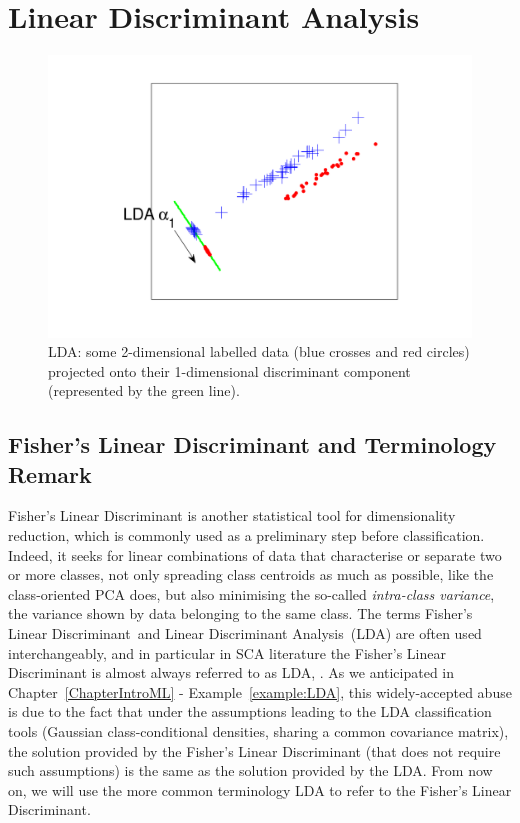 
\section{Linear Discriminant Analysis}\label{sec:LDA}

\begin{figure}
\centering
\includegraphics[width=.5\textwidth]{../Figures/PCA_LDA_geometric/LDAprojection.pdf} 
\caption{LDA: some 2-dimensional labelled data (blue crosses and red circles) projected onto their 1-dimensional discriminant component (represented by the green line).}\label{fig:LDAprojection}
\end{figure}

\subsection{Fisher's Linear Discriminant and Terminology Remark}
Fisher's Linear Discriminant \cite{Fukunaga} is another statistical tool for dimensionality reduction, which is commonly used as a preliminary step before classification. Indeed, it seeks for linear combinations of data that characterise or separate two or more classes, not only spreading class centroids as much as possible, like the class-oriented PCA does, but also minimising the so-called {\em intra-class variance}, \ie the variance shown by data belonging to the same class. The terms \textquotedbl Fisher's Linear Discriminant\textquotedbl \  and \textquotedbl Linear Discriminant Analysis\textquotedbl \ (LDA) are often used interchangeably, and in particular in SCA literature the Fisher's Linear Discriminant is almost always referred to as LDA, \eg \cite{Standaert2008,lessIsMore}. As we anticipated in Chapter~\ref{ChapterIntroML} - Example~\ref{example:LDA}, this widely-accepted abuse is due to the fact that under the assumptions leading to the LDA classification tools (\ie Gaussian class-conditional densities, sharing a common covariance matrix), the solution provided by the Fisher's Linear Discriminant (that does not require such assumptions) is the same as the solution provided by the LDA. From now on, we will use the more common terminology LDA to refer to the Fisher's Linear Discriminant. \\

